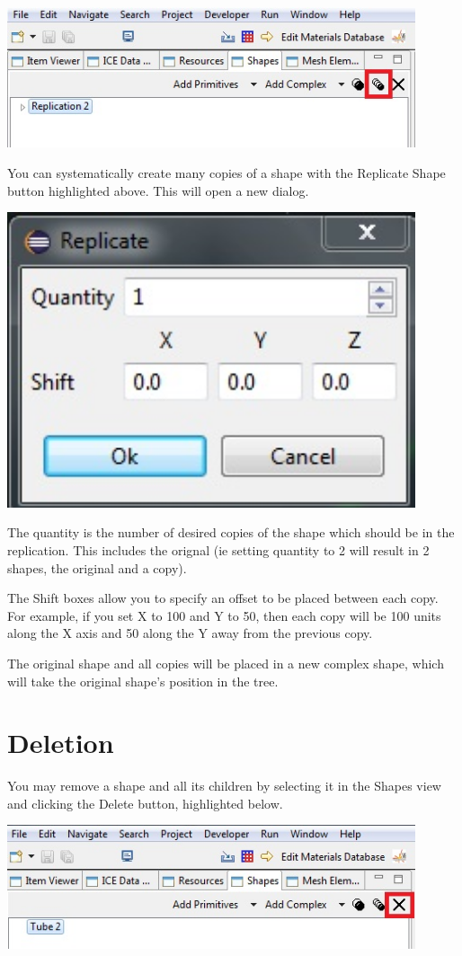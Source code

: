 \begin{center}
\includegraphics[width=12cm]{images/GeometryReplicateShape.jpg}
\end{center}

You can systematically create many copies of a shape with the Replicate Shape
button highlighted above. This will open a new dialog.

\begin{center}
\includegraphics[width=12cm]{images/GeometryReplicateDialog.jpg}
\end{center}

The quantity is the number of desired copies of the shape which should be in the
replication. This includes the orignal (ie setting quantity to 2 will result in
2 shapes, the original and a copy).

The Shift boxes allow you to specify an offset to be placed between each copy.
For example, if you set X to 100 and Y to 50, then each copy will be 100 units
along the X axis and 50 along the Y away from the previous copy. 

The original shape and all copies will be placed in a new complex shape, which
will take the original shape's position in the tree.

\section{Deletion}

You may remove a shape and all its children by selecting it in the Shapes view
and clicking the Delete button, highlighted below.

\begin{center}
\includegraphics[width=12cm]{images/GeometryDeleteButton.jpg}
\end{center}